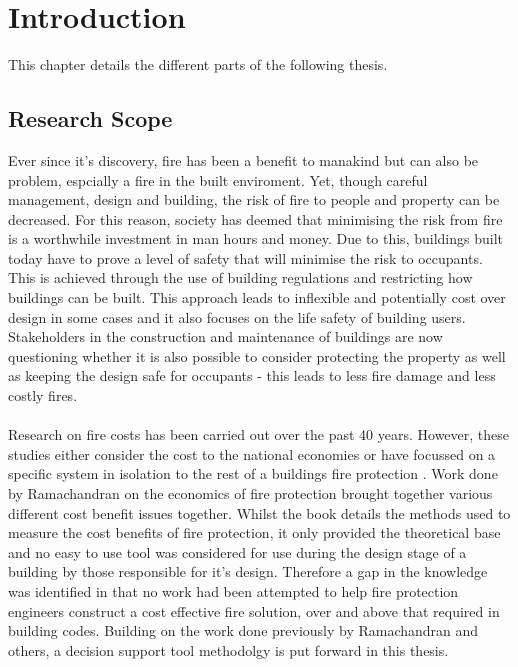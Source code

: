 \documentclass[table,a4paper,oneside]{book}
\begin{document}
\onehalfspacing

\chapter{Introduction}
\label{chap:Introduction}

This chapter details the different parts of the following thesis.

\section{Research Scope}
\label{sec:Scope}
Ever since it's discovery, fire has been a benefit to manakind but can also be problem, espcially a fire in the built enviroment. Yet, though careful management, design and building, the risk of fire to people and property can be decreased. For this reason, society has deemed that minimising the risk from fire is a worthwhile investment in man hours and money. Due to this, buildings built today have to prove a level of safety that will minimise the risk to occupants. This is achieved through the use of building regulations and restricting how buildings can be built. This approach leads to inflexible and potentially cost over design in some cases and it also focuses on the life safety of building users. Stakeholders in the construction and maintenance of buildings are now questioning whether it is also possible to consider protecting the property as well as keeping the design safe for occupants \citep{} - this leads to less fire damage and less costly fires.
\\
\\
Research on fire costs has been carried out over the past 40 years. However, these studies either consider the cost to the national economies \citep{Rutstein1983a,Juaas1994} or have focussed on a specific system in isolation to the rest of a buildings fire protection \citep{Luck1973,Butry2009}. Work done by Ramachandran on the economics of fire protection \citep{Ramachandran1998} brought together various different cost benefit issues together. Whilst the book details the methods used to measure the cost benefits of fire protection, it only provided the theoretical base and no easy to use tool was considered for use during the design stage of a building by those responsible for it's design. Therefore a gap in the knowledge was identified in that no work had been attempted to help fire protection engineers construct a cost effective fire solution, over and above that required in building codes. Building on the work done previously by Ramachandran and others, a decision support tool methodolgy is put forward in this thesis.
\end{document}
